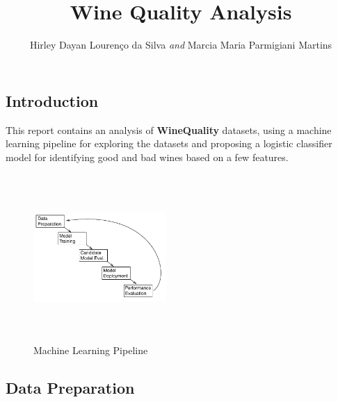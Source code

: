 \documentclass[a4paperpaper,9pt,twocolumn,twoside,printwatermark=false]{pinp}
\title{Wine Quality Analysis}
\author[]{Hirley Dayan Lourenço da Silva \emph{and} Marcia Maria Parmigiani
Martins}
\begin{document}
\verticaladjustment{-2pt}

\maketitle
\thispagestyle{firststyle}



\subsection{Introduction}\label{introduction}

This report contains an analysis of \textbf{WineQuality} datasets, using
a machine learning pipeline for exploring the datasets and proposing a
logistic classifier model for identifying good and bad wines based on a
few features.

\begin{figure}[h]
  \begin{center}
    \includegraphics[width=0.45\textwidth, height=2.5in]{pipeline} 
  \caption{Machine Learning Pipeline}\label{fig}
  \end{center}
\end{figure}

\subsection{Data Preparation}\label{data-preparation}
\end{document}
